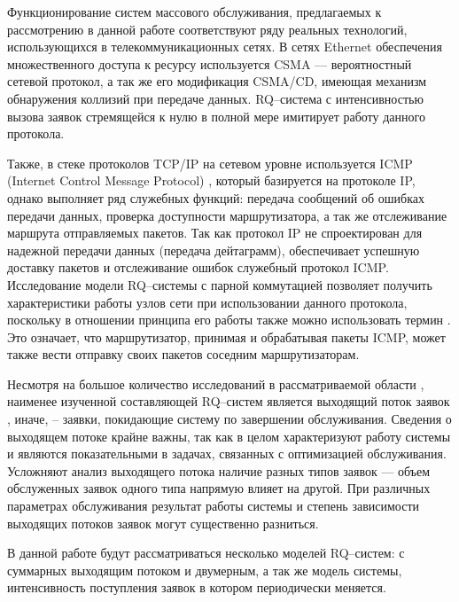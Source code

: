 Функционирование систем массового обслуживания, предлагаемых к рассмотрению в данной работе соответствуют ряду реальных технологий, использующихся в телекоммуникационных сетях. В сетях Ethernet обеспечения множественного доступа к ресурсу используется CSMA \cite{christensen2010ieee,nutt1982performance} --- вероятностный сетевой протокол, а так же его модификация CSMA/CD, имеющая механизм обнаружения коллизий при передаче данных. RQ--система с интенсивностью вызова заявок стремящейся к нулю в полной мере имитирует работу данного протокола.

Также, в стеке протоколов TCP/IP на сетевом уровне используется ICMP (Internet Control Message Protocol) \cite{bellovin2003icmp}, который базируется на протоколе IP, однако выполняет ряд служебных функций: передача сообщений об ошибках передачи данных, проверка доступности маршрутизатора, а так же отслеживание маршрута отправляемых пакетов. Так как протокол IP не спроектирован для надежной передачи данных (передача дейтаграмм), обеспечивает успешную доставку пакетов и отслеживание ошибок служебный протокол ICMP. Исследование модели RQ--системы с парной коммутацией позволяет получить характеристики работы узлов сети при использовании данного протокола, поскольку в отношении принципа его работы также можно использовать термин . Это означает, что маршрутизатор, принимая и обрабатывая пакеты ICMP, может также вести отправку своих пакетов соседним маршрутизаторам. 

Несмотря на большое количество исследований в рассматриваемой области \cite{artalejo2010mean,nazarov2017asymptotic,phung2019retrial,kulkarni1983queueing,paul2018retrial}, наименее изученной составляющей RQ--систем является выходящий поток заявок \cite{daley1976queueing}, иначе, -- заявки, покидающие систему по завершении обслуживания. Сведения о выходящем потоке крайне важны, так как в целом характеризуют работу системы и являются показательными в задачах, связанных с оптимизацией обслуживания. Усложняют анализ выходящего потока наличие разных типов заявок --- объем обслуженных заявок одного типа напрямую влияет на другой. При различных параметрах обслуживания результат работы системы и степень зависимости выходящих потоков заявок могут существенно разниться. 

В данной работе будут рассматриваться несколько моделей RQ--систем: с суммарных выходящим потоком и двумерным, а так же модель системы, интенсивность поступления заявок в котором периодически меняется.

